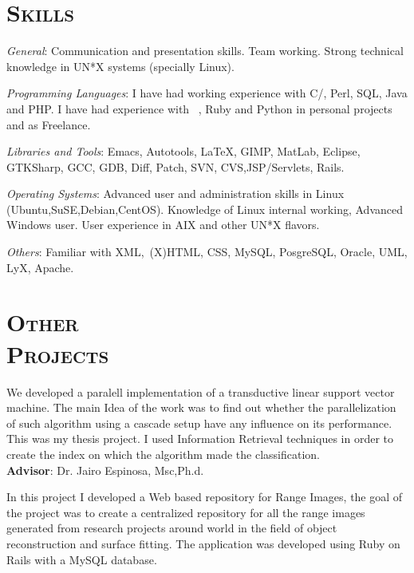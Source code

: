 \begin{resume}

\section{\textsc{Skills}}

\emph{General}: Communication and presentation skills. Team
working. Strong technical knowledge in UN*X systems (specially Linux).

\emph{Programming Languages}: I have had working experience with
 C/\Cplusplus, Perl, SQL, Java and PHP. I have had experience with \
 \CSharp, Ruby and Python in personal projects and as Freelance.

\emph{Libraries and Tools}: Emacs, Autotools, \LaTeX, GIMP, MatLab, Eclipse, GTKSharp, GCC, GDB, Diff, Patch, SVN, CVS,JSP/Servlets, Rails.

\emph{Operating Systems}: Advanced user and administration skills in
Linux (Ubuntu,SuSE,Debian,CentOS). Knowledge of Linux internal
working, Advanced Windows user. User experience in  AIX and  other UN*X flavors.

\emph{Others}: Familiar with  XML,\ (X)HTML, CSS, MySQL, PosgreSQL, Oracle, UML, LyX, Apache.


\section{\textsc{Other\\  Projects}}

\dates{July 2007 - December 2007}
\begin{position}
We developed a paralell implementation of a transductive
linear support vector machine. The main Idea of the work was
to find out whether the parallelization of such algorithm using a cascade
setup have any influence on its performance. This was my thesis
project. I used Information Retrieval techniques in order to create
the index on which the algorithm made the classification.
\\
\textbf{Advisor}:  Dr. Jairo Espinosa, Msc,Ph.d.
\end{position}

\begin{position}
 In this project I developed a Web based repository for Range Images, the goal of the
 project was to create a centralized repository for all the range
 images generated from research projects around world in the field of
 object reconstruction and surface fitting. The application was
 developed using Ruby on Rails with a MySQL database.
\end{position}


\end{resume}
